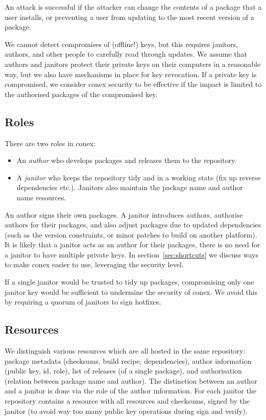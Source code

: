 \documentclass[nocopyrightspace]{sigplanconf}
\begin{document}
An attack is successful if the attacker can change the contents of a package that a user installs, or preventing a user from updating to the most recent version of a package.

We cannot detect compromises of (offline!) keys, but this requires janitors, authors, and other people to carefully read through updates.
We assume that authors and janitors protect their private keys on their computers in a reasonable way, but we also have mechanisms in place for key revocation.
If a private key is compromised, we consider conex security to be effective if the impact is limited to the authorised packages of the compromised key.

\subsection{Roles}
There are two roles in conex:
\begin{itemize}
  \item An \emph{author} who develops packages and releases them to the repository.
  \item A \emph{janitor} who keeps the repository tidy and in a working state (fix up reverse dependencies etc.).  Janitors also maintain the package name and author name resources.
\end{itemize}

An author signs their own packages.
A janitor introduces authors, authorise authors for their packages, and also adjust packages due to updated dependencies (such as the version constraints, or minor patches to build on another platform).
It is likely that a janitor acts as an author for their packages, there is no need for a janitor to have multiple private keys.
In section~\ref{sec:shortcuts} we discuss ways to make conex easier to use, leveraging the security level.

If a single janitor would be trusted to tidy up packages, compromising only one janitor key would be sufficient to undermine the security of conex.
We avoid this by requiring a quorum of janitors to sign hotfixes.

\subsection{Resources}
We distinguish various resources which are all hosted in the same repository:
package metadata (checksums, build recipe, dependencies), author information (public key, id, role), list of releases (of a single package), and authorisation (relation between package name and author).
The distinction between an author and a janitor is done via the role of the author information.
For each janitor the repository contains a resource with all resources and checksums, signed by the janitor (to avoid way too many public key operations during sign and verify).
\end{document}
